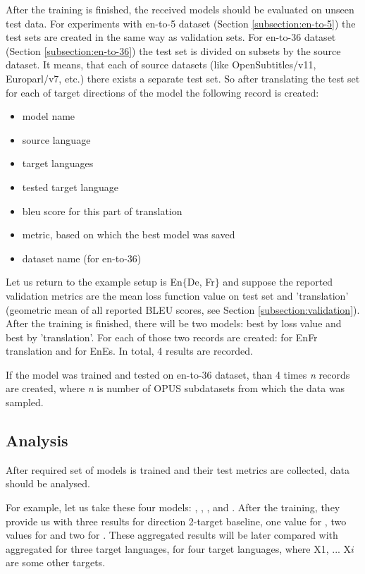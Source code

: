After the training is finished, the received models should be evaluated on unseen
test data.
For experiments with \gls{en-to-5} dataset (Section \ref{subsection:en-to-5})
the test sets are created in the same way as validation sets.
For \gls{en-to-36} dataset (Section \ref{subsection:en-to-36})
the test set is divided on subsets by the source dataset.
It means, that each of source datasets (like OpenSubtitles/v11, 
Europarl/v7, etc.) there exists a separate test set.
So after translating the test set for each of target directions of the model
the following record is created:
\begin{itemize}
	\item model name
	\item source language
	\item target languages
	\item tested target language
	\item \acrshort{bleu} score for this part of translation
	\item metric, based on which the best model was saved
	\item dataset name (for \gls{en-to-36})
\end{itemize}

Let us return to the example setup is En\to{}$\{$De, Fr$\}$ and
suppose the reported validation metrics are the mean loss function value on
test set and 'translation' (geometric mean of all reported BLEU scores,
see Section \ref{subsection:validation}).
After the training is finished, there will be two models: best by
loss value and best by 'translation'.
For each of those two records are created: for En\to{}Fr translation
and for En\to{}Es. In total, 4 results are recorded.

If the model was trained and tested on \gls{en-to-36} dataset,
than 4 times \textit{n} records are created, where \textit{n}
is number of OPUS subdatasets from which the data was sampled.


\subsection{Analysis}

After required set of models is trained and their test
metrics are collected, data should be analysed.

For example, let us take these four models: ,
, , and .
After the training, they provide us with three results for 
direction 2-target baseline,
one value for ,
two values for 
and two for .
These aggregated  results will be later compared with
aggregated  for three target languages,
 for four target languages, where X1, ... X$i$ are
some other targets.


